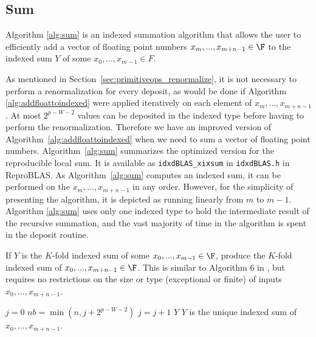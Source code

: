 \subsection{Sum}
  \label{sec:primitiveops_sum}
    Algorithm \ref{alg:sum} is an indexed summation algorithm that allows the user to efficiently add a vector of floating point numbers $x_m, ..., x_{m + n - 1} \in \F$ to the indexed sum $Y$ of some $x_0, ..., x_{m - 1} \in F$.

    As mentioned in Section~\ref{sec:primitiveops_renormalize}, it is not necessary to perform
    a renormalization for every deposit, as would be done if Algorithm \ref{alg:addfloattoindexed} were applied iteratively on each element of $x_m, ..., x_{m + n -1}$. At most $2^{p-W-2}$ values can be deposited in the indexed type before having to perform the renormalization.
    Therefore we have an improved version of Algorithm~\ref{alg:addfloattoindexed} when we need to sum a vector of floating point numbers.
    Algorithm~\ref{alg:sum} summarizes the optimized version for the reproducible local sum. It is available as \texttt{idxdBLAS\_xixsum} in \texttt{idxdBLAS.h} in ReproBLAS.
    As Algorithm~\ref{alg:sum} computes an indexed sum, it can be performed on the $x_m, ..., x_{m + n - 1}$ in any order. However, for the simplicity of presenting the algorithm, it is depicted as running linearly from $m$ to $m-1$.
    Algorithm \ref{alg:sum} uses only one indexed type to hold the intermediate result of the recursive summation, and the vast majority of time in the algorithm is spent in the deposit routine.
    \begin{samepage}
    \begin{alg}
      If $Y$ is the $K$-fold indexed sum of some $x_0, ..., x_{m - 1} \in \F$, produce the $K$-fold indexed sum of $x_0, ..., x_{m + n - 1} \in \F$.
      This is similar to Algorithm $6$ in \cite{repsum}, but requires no restrictions on the size or type (exceptional or finite) of inputs $x_0, ..., x_{m + n - 1}$.
      \begin{algorithmic}[1]
          \State $j = 0$ \label{alg:sum:setj}
          \label{alg:sum:outerloop}
            \State $nb = \min(n, j + 2^{p - W - 2})$
            \State \Call{Update}{$K$, $\max([|x_{m + j}|, ..., |x_{m + nb - 1}|)$, Y}\label{alg:sum:update}
              \State {}\label{alg:sum:deposit}
              \State $j = j + 1$
            \EndWhile
            \State {}\label{alg:sum:renorm}
          \EndWhile
          \State \Return $Y$
        \EndFunction
        \Ensure
        \Statex $Y$ is the unique indexed sum of $x_0, ..., x_{m + n - 1}$.
      \end{algorithmic}
      \label{alg:sum}
    \end{alg}
    \end{samepage}

